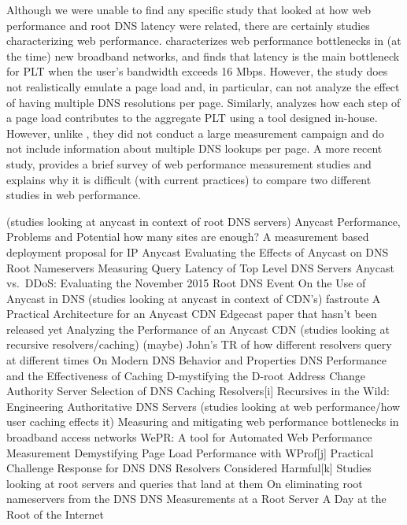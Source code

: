 \documentclass[sigconf,nonacm,10pt]{acmart}
\begin{document}
Although we were unable to find any specific study that looked at how
web performance and root DNS latency were related, there are certainly
studies characterizing web performance. \cite{sundaresan2013web}
characterizes web performance bottlenecks in (at the time) new broadband
networks, and finds that latency is the main bottleneck for PLT when the
user's bandwidth exceeds 16 Mbps. However, the study does not
realistically emulate a page load and, in particular, can not analyze
the effect of having multiple DNS resolutions per page. Similarly,
\cite{asrese2016wepr} analyzes how each step of a page load contributes
to the aggregate PLT using a tool designed in-house. However, unlike
\cite{sundaresan2013web}, they did not conduct a large measurement
campaign and do not include information about multiple DNS lookups per
page. A more recent study, \cite{enghardt2019web} provides a brief
survey of web performance measurement studies and explains why it is
difficult (with current practices) to compare two different studies in
web performance.

\iffalse

(studies looking at anycast in context of root DNS servers) Anycast
Performance, Problems and Potential how many sites are enough? A
measurement based deployment proposal for IP Anycast Evaluating the
Effects of Anycast on DNS Root Nameservers Measuring Query Latency of
Top Level DNS Servers Anycast vs.~DDoS: Evaluating the November 2015
Root DNS Event On the Use of Anycast in DNS (studies looking at anycast
in context of CDN's) fastroute A Practical Architecture for an Anycast
CDN Edgecast paper that hasn't been released yet Analyzing the
Performance of an Anycast CDN (studies looking at recursive
resolvers/caching) (maybe) John's TR of how different resolvers query at
different times On Modern DNS Behavior and Properties DNS Performance
and the Effectiveness of Caching D-mystifying the D-root Address Change
Authority Server Selection of DNS Caching Resolvers{[}i{]} Recursives in
the Wild: Engineering Authoritative DNS Servers (studies looking at web
performance/how user caching effects it) Measuring and mitigating web
performance bottlenecks in broadband access networks WePR: A tool for
Automated Web Performance Measurement Demystifying Page Load Performance
with WProf{[}j{]} Practical Challenge Response for DNS DNS Resolvers
Considered Harmful{[}k{]} Studies looking at root servers and queries
that land at them On eliminating root nameservers from the DNS DNS
Measurements at a Root Server A Day at the Root of the Internet
\end{document}
